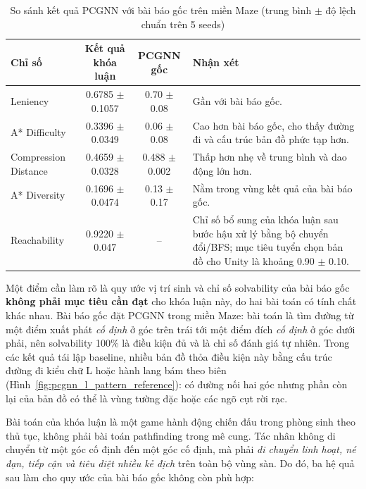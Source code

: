 \begin{table}[H]
    \centering
    \small
    \caption{So sánh kết quả PCGNN với bài báo gốc trên miền Maze (trung bình $\pm$ độ lệch chuẩn trên 5 seeds)}
    \label{tab:pcgnn_paper_comparison}
    \begin{tabular}{l c c p{5.8cm}}
        \toprule
        \textbf{Chỉ số} & \textbf{Kết quả khóa luận} & \textbf{PCGNN gốc} & \textbf{Nhận xét} \\
        \midrule
        Leniency & 0.6785 $\pm$ 0.1057 & 0.70 $\pm$ 0.08 & Gần với bài báo gốc. \\
        A* Difficulty & 0.3396 $\pm$ 0.0349 & 0.06 $\pm$ 0.08 & Cao hơn bài báo gốc, cho thấy đường đi và cấu trúc bản đồ phức tạp hơn. \\
        Compression Distance & 0.4659 $\pm$ 0.0328 & 0.488 $\pm$ 0.002 & Thấp hơn nhẹ về trung bình và dao động lớn hơn. \\
        A* Diversity & 0.1696 $\pm$ 0.0474 & 0.13 $\pm$ 0.17 & Nằm trong vùng kết quả của bài báo gốc. \\
        Reachability & 0.9220 $\pm$ 0.047 & -- & Chỉ số bổ sung của khóa luận sau bước hậu xử lý bằng bộ chuyển đổi/BFS; mục tiêu tuyển chọn bản đồ cho Unity là khoảng 0.90 $\pm$ 0.10. \\
        \bottomrule
    \end{tabular}
\end{table}

Một điểm cần làm rõ là quy ước vị trí sinh và chỉ số solvability của bài báo gốc \textbf{không phải mục tiêu cần đạt} cho khóa luận này, do hai bài toán có tính chất khác nhau. Bài báo gốc đặt PCGNN trong miền Maze: bài toán là tìm đường từ một điểm xuất phát \emph{cố định} ở góc trên trái tới một điểm đích \emph{cố định} ở góc dưới phải, nên solvability 100\% là điều kiện đủ và là chỉ số đánh giá tự nhiên. Trong các kết quả tái lập baseline, nhiều bản đồ thỏa điều kiện này bằng cấu trúc đường đi kiểu chữ L hoặc hành lang bám theo biên (Hình~\ref{fig:pcgnn_l_pattern_reference}): có đường nối hai góc nhưng phần còn lại của bản đồ có thể là vùng tường đặc hoặc các ngõ cụt rời rạc.

Bài toán của khóa luận là một game hành động chiến đấu trong phòng sinh theo thủ tục, không phải bài toán pathfinding trong mê cung. Tác nhân không di chuyển từ một góc cố định đến một góc cố định, mà phải \emph{di chuyển linh hoạt, né đạn, tiếp cận và tiêu diệt nhiều kẻ địch} trên toàn bộ vùng sàn. Do đó, ba hệ quả sau làm cho quy ước của bài báo gốc không còn phù hợp:

